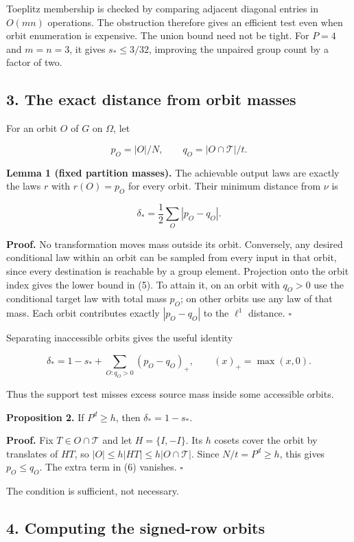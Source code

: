 \documentclass[
]{article}
\begin{document}
Toeplitz membership is checked by comparing adjacent diagonal entries in
\(O(mn)\) operations. The obstruction therefore gives an efficient test
even when orbit enumeration is expensive. The union bound need not be
tight. For \(P=4\) and \(m=n=3\), it gives \(s_*\le3/32\), improving the
unpaired group count by a factor of two.

\subsection{3. The exact distance from orbit
masses}\label{the-exact-distance-from-orbit-masses}

For an orbit \(O\) of \(G\) on \(\Omega\), let

\[
p_O=|O|/N,\qquad q_O=|O\cap\mathcal T|/t.
\]

\textbf{Lemma 1 (fixed partition masses).} The achievable output laws
are exactly the laws \(r\) with \(r(O)=p_O\) for every orbit. Their
minimum distance from \(\nu\) is

\[
\delta_* =\frac12\sum_O|p_O-q_O|.
\tag{5}
\]

\textbf{Proof.} No transformation moves mass outside its orbit.
Conversely, any desired conditional law within an orbit can be sampled
from every input in that orbit, since every destination is reachable by
a group element. Projection onto the orbit index gives the lower bound
in (5). To attain it, on an orbit with \(q_O>0\) use the conditional
target law with total mass \(p_O\); on other orbits use any law of that
mass. Each orbit contributes exactly \(|p_O-q_O|\) to the \(\ell^1\)
distance. \(\square\)

Separating inaccessible orbits gives the useful identity

\[
\delta_* =1-s_*+\sum_{O:q_O>0}(p_O-q_O)_+,
\qquad (x)_+=\max(x,0).
\tag{6}
\]

Thus the support test misses excess source mass inside some accessible
orbits.

\textbf{Proposition 2.} If \(P^d\ge h\), then \(\delta_*=1-s_*\).

\textbf{Proof.} Fix \(T\in O\cap\mathcal T\) and let \(H=\{I,-I\}\). Its
\(h\) cosets cover the orbit by translates of \(HT\), so
\(|O|\le h|HT|\le h|O\cap\mathcal T|\). Since \(N/t=P^d\ge h\), this
gives \(p_O\le q_O\). The extra term in (6) vanishes. \(\square\)

The condition is sufficient, not necessary.

\subsection{4. Computing the signed-row
orbits}\label{computing-the-signed-row-orbits}
\end{document}
